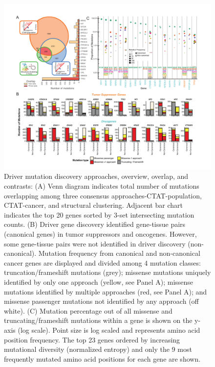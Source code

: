 \begin{figure}
  \centering
  \makeatletter
  \let\@currsize\normalsize
  \includegraphics[width=\linewidth]{figures/chapter7/driver_mutation.pdf}
  \caption[Driver mutation discovery approaches, overview, overlap, and contrasts]{Driver mutation discovery approaches, overview, overlap, and contrasts: (A) Venn diagram indicates total number of mutations overlapping among three consensus approaches-CTAT-population, CTAT-cancer, and structural clustering. Adjacent bar chart indicates the top 20 genes sorted by 3-set intersecting mutation counts. (B) Driver gene discovery identified gene-tissue pairs (canonical genes) in tumor suppressors and oncogenes. However, some gene-tissue pairs were not identified in driver discovery (non-canonical). Mutation frequency from canonical and non-canonical cancer genes are displayed and divided among 4 mutation classes: truncation/frameshift mutations (grey); missense mutations uniquely identified by only one approach (yellow, see Panel A); missense mutations identified by multiple approaches (red, see Panel A); and missense passenger mutations not identified by any approach (off white). (C) Mutation percentage out of all missense and truncating/frameshift mutations within a gene is shown on the y-axis (log scale). Point size is log scaled and represents amino acid position frequency. The top 23 genes ordered by increasing mutational diversity (normalized entropy) and only the 9 most frequently mutated amino acid positions for each gene are shown.}
  \label{fig:driver_mutation}
\end{figure}

